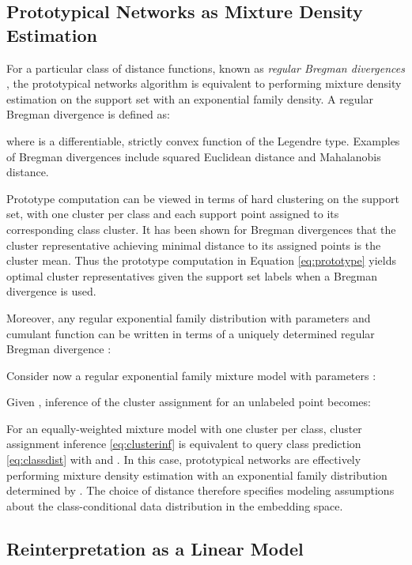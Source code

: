 \documentclass{article}
\begin{document}
\subsection{Prototypical Networks as Mixture Density Estimation}
\label{sec:bregman}

For a particular class of distance functions, known as \emph{regular Bregman divergences} \cite{banerjee2005clustering}, the prototypical networks algorithm is equivalent to performing mixture density estimation on the support set with an exponential family density. A regular Bregman divergence  is defined as:

where  is a differentiable, strictly convex function of the Legendre type. Examples of Bregman divergences include squared Euclidean distance  and Mahalanobis distance.

Prototype computation can be viewed in terms of hard clustering on the support set, with one cluster per class and each support point assigned to its corresponding class cluster. It has been shown \cite{banerjee2005clustering} for Bregman divergences that the cluster representative achieving minimal distance to its assigned points is the cluster mean. Thus the prototype computation in Equation \eqref{eq:prototype} yields optimal cluster representatives given the support set labels when a Bregman divergence is used.

Moreover, any regular exponential family distribution  with parameters  and cumulant function  can be written in terms of a uniquely determined regular Bregman divergence \cite{banerjee2005clustering}:

Consider now a regular exponential family mixture model with parameters :

Given , inference of the cluster assignment  for an unlabeled point  becomes:

For an equally-weighted mixture model with one cluster per class, cluster assignment inference \eqref{eq:clusterinf} is equivalent to query class prediction \eqref{eq:classdist} with  and .
In this case, prototypical networks are effectively performing mixture density estimation with an exponential family distribution determined by . The choice of distance therefore specifies modeling assumptions about the class-conditional data distribution in the embedding space.
\subsection{Reinterpretation as a Linear Model}
\end{document}
